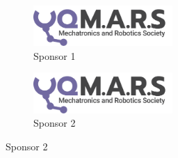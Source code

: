\documentclass[a4paper,12pt]{report}
\begin{document}
\begin{figure}[!htb]
    \captionsetup[subfigure]{labelformat=empty}
     \centering
        \begin{subfigure}[b]{0.3\textwidth}
        \centering
        \includegraphics[width=200]{Assets/Logo (Dark).png}
        \caption{Sponsor 1}
        \end{subfigure}
     \hfill
        \begin{subfigure}[b]{0.5\textwidth}
        \centering
        \includegraphics[width=200]{Assets/Logo (Dark).png}
        \caption{Sponsor 2}
        \end{subfigure}
\end{figure}
\end{document}

